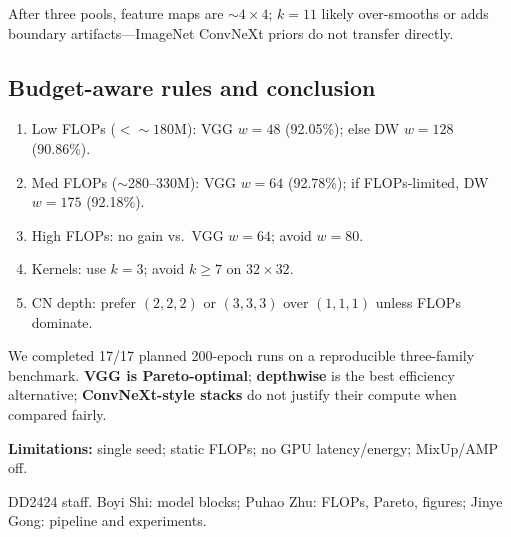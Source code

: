 \documentclass{article}
\begin{document}
After three pools, feature maps are $\sim 4{\times}4$; $k{=}11$ likely over-smooths or adds boundary artifacts---ImageNet ConvNeXt priors do not transfer directly.

\subsection{Budget-aware rules and conclusion}

\begin{enumerate}[label=(\roman*)]
  \item Low FLOPs ($<{\sim}180$M): VGG $w{=}48$ (92.05\%); else DW $w{=}128$ (90.86\%).
  \item Med FLOPs ($\sim$280--330M): VGG $w{=}64$ (92.78\%); if FLOPs-limited, DW $w{=}175$ (92.18\%).
  \item High FLOPs: no gain vs.\ VGG $w{=}64$; avoid $w{=}80$.
  \item Kernels: use $k{=}3$; avoid $k{\geq}7$ on $32{\times}32$.
  \item CN depth: prefer $(2,2,2)$ or $(3,3,3)$ over $(1,1,1)$ unless FLOPs dominate.
\end{enumerate}

We completed 17/17 planned 200-epoch runs on a reproducible three-family benchmark. \textbf{VGG is Pareto-optimal}; \textbf{depthwise} is the best efficiency alternative; \textbf{ConvNeXt-style stacks} do not justify their compute when compared fairly.

\textbf{Limitations:} single seed; static FLOPs; no GPU latency/energy; MixUp/AMP off.

\begin{ack}
  DD2424 staff. Boyi Shi: model blocks; Puhao Zhu: FLOPs, Pareto, figures; Jinye Gong: pipeline and experiments.
\end{ack}



\end{document}

